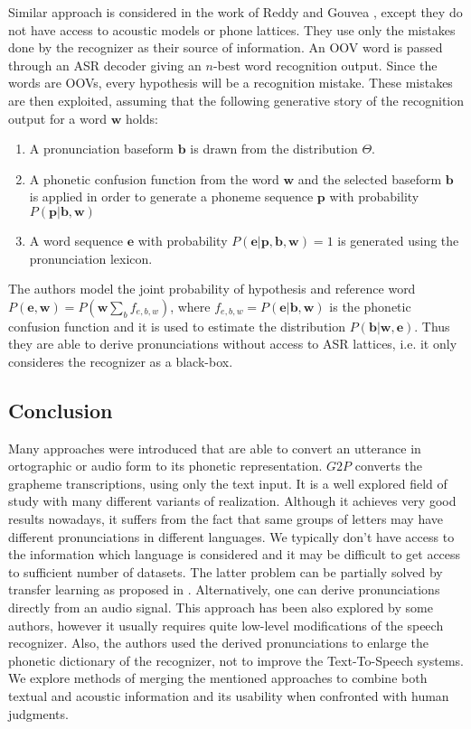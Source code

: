 Similar approach is considered in the work of Reddy and Gouvea \cite{reddy2011learning}, except they do not have access to acoustic models or phone lattices.
They use only the mistakes done by the recognizer as their source of information.
An OOV word is passed through an ASR decoder giving an $n$-best word recognition output.
Since the words are OOVs, every hypothesis will be a recognition mistake.
These mistakes are then exploited, assuming that the following generative story of the recognition output
for a word $\mathbf{w}$ holds:
\begin{enumerate}
\item A pronunciation baseform $\mathbf{b}$ is drawn from the distribution $\Theta$.
\item A phonetic confusion function from the word $\mathbf{w}$ and the selected baseform $\mathbf{b}$ is applied in order to generate a phoneme sequence $\mathbf{p}$ with probability $P(\mathbf{p}|\mathbf{b},\mathbf{w})$
\item A word sequence $\mathbf{e}$ with probability $P (\mathbf{e} \vert \mathbf{p},\mathbf{b},\mathbf{w}) = 1$ 
is generated using the pronunciation lexicon.
\end{enumerate}
The authors model the joint probability of hypothesis and reference word $P(\mathbf{e}, \mathbf{w}) = P(\mathbf{w}\sum_b f_{e,b,w})$, where $f_{e,b,w} = P(\mathbf{e}\vert \mathbf{b}, \mathbf{w})$ is the phonetic confusion function and it is used to estimate the distribution $P(\mathbf{b}\vert\mathbf{w},\mathbf{e})$.
Thus they are able to derive pronunciations without access to ASR lattices, i.e. it only consideres the recognizer as a black-box. 
\subsection{Conclusion}
Many approaches were introduced that are able to convert an utterance in ortographic or audio form to its phonetic representation.
$G2P$ converts the grapheme transcriptions, using only the text input.
It is a well explored field of study with many different variants of realization.
Although it achieves very good results nowadays, it suffers from the fact that same groups of letters may have different pronunciations in different languages.
We typically don't have access to the information which language is considered and it may be difficult to get access to sufficient number of datasets.
The latter problem can be partially solved by transfer learning as proposed in \cite{deri2016grapheme}.
\linebreak\linebreak
Alternatively, one can derive pronunciations directly from an audio signal.
This approach has been also explored by some authors, however it usually requires quite low-level modifications of the speech recognizer.
Also, the authors used the derived pronunciations to enlarge the phonetic dictionary of the recognizer, not to improve the Text-To-Speech systems.
We explore methods of merging the mentioned approaches to combine both textual and acoustic information and its usability when confronted with human judgments.